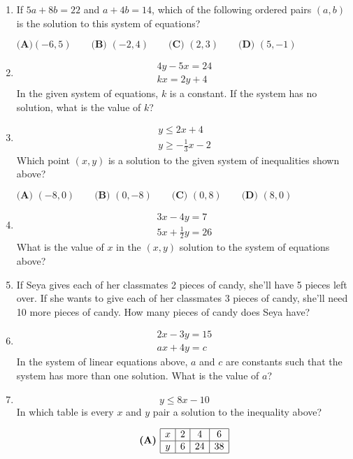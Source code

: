 \documentclass[../satmath.tex]{subfiles}
\begin{document}
\begin{enumerate}[label=\bfseries\arabic*.]
\item If $5a+8b=22$ and $a+4b=14$, which of the following ordered pairs $(a,b)$ is the solution to this system of equations?

$\textbf{(A)} (-6,5) \qquad \textbf{(B) } (-2,4) \qquad \textbf{(C) } (2,3) \qquad \textbf{(D) } (5,-1)$

\item 

\begin{align*}
4y-5x=24\\
kx=2y+4
\end{align*}
In the given system of equations, $k$ is a constant. If the system has no solution, what is the value of $k$?

\item 
\begin{align*}
y\leq 2x+4\\
y\geq -\frac{1}{3}x-2
\end{align*}
Which point $(x,y)$ is a solution to the given system of inequalities shown above?

$\textbf{(A) } (-8,0) \qquad \textbf{(B) } (0,-8) \qquad \textbf{(C) } (0,8) \qquad \textbf{(D) } (8,0)$

\item 
\begin{align*}
3x-4y=7\\
5x+\frac{1}{2}y=26
\end{align*}
What is the value of $x$ in the $(x,y)$ solution to the system of equations above?

\item If Seya gives each of her classmates 2 pieces of candy, she'll have 5 pieces left over. If she wants to give each of her classmates 3 pieces 
of candy, she'll need 10 more pieces of candy. How many pieces of candy does Seya have?

\item 
\begin{align*}
2x-3y=15\\
ax+4y=c
\end{align*}
In the system of linear equations above, $a$ and $c$ are constants such that the system has more than one solution. What is the value of $a$?
 
\item  

\[y\leq 8x-10\]
In which table is every $x$ and $y$ pair a solution to the inequality above?

\[
\textbf{(A) }
\begin{array}{|c|c|c|c|}
\hline
x & 2 & 4 & 6 \\ \hline
y & 6 & 24 & 38 \\ \hline
\end{array}
\]


\end{enumerate}
\end{document}
